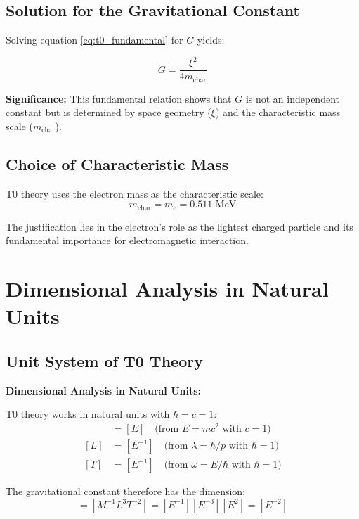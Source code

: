 \documentclass[12pt,a4paper]{article}
\begin{document}
	\subsection{Solution for the Gravitational Constant}
	
	Solving equation \eqref{eq:t0_fundamental} for $G$ yields:
	
	\begin{equation}
		G = \frac{\xi^2}{4 m_{\text{char}}}
		\label{eq:g_fundamental}
	\end{equation}
	
	\textbf{Significance:} This fundamental relation shows that $G$ is not an independent constant but is determined by space geometry ($\xi$) and the characteristic mass scale ($m_{\text{char}}$).
	
	\subsection{Choice of Characteristic Mass}
	
	T0 theory uses the electron mass as the characteristic scale:
	\begin{equation}
		m_{\text{char}} = m_e = 0.511 \text{ MeV}
		\label{eq:characteristic_mass}
	\end{equation}
	
	The justification lies in the electron's role as the lightest charged particle and its fundamental importance for electromagnetic interaction.
	
	\section{Dimensional Analysis in Natural Units}
	
	\subsection{Unit System of T0 Theory}
	
	\begin{dimensional}
		\textbf{Dimensional Analysis in Natural Units:}
		
		T0 theory works in natural units with $\hbar = c = 1$:
		\begin{align}
			[M] &= [E] \quad \text{(from } E = mc^2 \text{ with } c = 1\text{)} \\
			[L] &= [E^{-1}] \quad \text{(from } \lambda = \hbar/p \text{ with } \hbar = 1\text{)} \\
			[T] &= [E^{-1}] \quad \text{(from } \omega = E/\hbar \text{ with } \hbar = 1\text{)}
		\end{align}
		
		The gravitational constant therefore has the dimension:
		\begin{equation}
			[G] = [M^{-1}L^3T^{-2}] = [E^{-1}][E^{-3}][E^2] = [E^{-2}]
		\end{equation}
	\end{dimensional}
	
\end{document}
